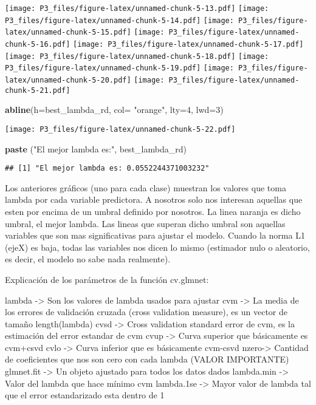 \documentclass[]{article}
\newenvironment{Shaded}{\begin{snugshade}}{\end{snugshade}}
\newcommand{\KeywordTok}[1]{\textcolor[rgb]{0.13,0.29,0.53}{\textbf{#1}}}
\newcommand{\DataTypeTok}[1]{\textcolor[rgb]{0.13,0.29,0.53}{#1}}
\newcommand{\DecValTok}[1]{\textcolor[rgb]{0.00,0.00,0.81}{#1}}
\newcommand{\StringTok}[1]{\textcolor[rgb]{0.31,0.60,0.02}{#1}}
\newcommand{\NormalTok}[1]{#1}
\begin{document}
\texttt{[image: P3\_files/figure-latex/unnamed-chunk-5-13.pdf]}
\texttt{[image: P3\_files/figure-latex/unnamed-chunk-5-14.pdf]}
\texttt{[image: P3\_files/figure-latex/unnamed-chunk-5-15.pdf]}
\texttt{[image: P3\_files/figure-latex/unnamed-chunk-5-16.pdf]}
\texttt{[image: P3\_files/figure-latex/unnamed-chunk-5-17.pdf]}
\texttt{[image: P3\_files/figure-latex/unnamed-chunk-5-18.pdf]}
\texttt{[image: P3\_files/figure-latex/unnamed-chunk-5-19.pdf]}
\texttt{[image: P3\_files/figure-latex/unnamed-chunk-5-20.pdf]}
\texttt{[image: P3\_files/figure-latex/unnamed-chunk-5-21.pdf]}

\begin{Shaded}
\begin{Highlighting}[]
\KeywordTok{abline}\NormalTok{(}\DataTypeTok{h=}\NormalTok{best_lambda_rd, }\DataTypeTok{col=} \StringTok{"orange"}\NormalTok{, }\DataTypeTok{lty=}\DecValTok{4}\NormalTok{, }\DataTypeTok{lwd=}\DecValTok{3}\NormalTok{)}
\end{Highlighting}
\end{Shaded}

\texttt{[image: P3\_files/figure-latex/unnamed-chunk-5-22.pdf]}

\begin{Shaded}
\begin{Highlighting}[]
\KeywordTok{paste}\NormalTok{ (}\StringTok{"El mejor lambda es:"}\NormalTok{, best_lambda_rd)}
\end{Highlighting}
\end{Shaded}

\begin{verbatim}
## [1] "El mejor lambda es: 0.0552244371003232"
\end{verbatim}

Los anteriores gráficos (uno para cada clase) muestran los valores que
toma lambda por cada variable predictora. A nosotros solo nos interesan
aquellas que esten por encima de un umbral definido por nosotros. La
linea naranja es dicho umbral, el mejor lambda. Las lineas que superan
dicho umbral son aquellas variables que son mas significativas para
ajustar el modelo. Cuando la norma L1 (ejeX) es baja, todas las
variables nos dicen lo mismo (estimador nulo o aleatorio, es decir, el
modelo no sabe nada realmente).

Explicación de los parámetros de la función cv.glmnet:

lambda -\textgreater{} Son los valores de lambda usados para ajustar cvm
-\textgreater{} La media de los errores de validación cruzada (cross
validation measure), es un vector de tamaño length(lambda) cvsd
-\textgreater{} Cross validation standard error de cvm, es la estimación
del error estandar de cvm cvup -\textgreater{} Curva superior que
básicamente es cvm+csvd cvlo -\textgreater{} Curva inferior que es
básicamente cvm-csvd nzero-\textgreater{} Cantidad de coeficientes que
nos son cero con cada lambda (VALOR IMPORTANTE) glmnet.fit
-\textgreater{} Un objeto ajustado para todos los datos dados lambda.min
-\textgreater{} Valor del lambda que hace mínimo cvm lambda.1se
-\textgreater{} Mayor valor de lambda tal que el error estandarizado
esta dentro de 1
\end{document}
